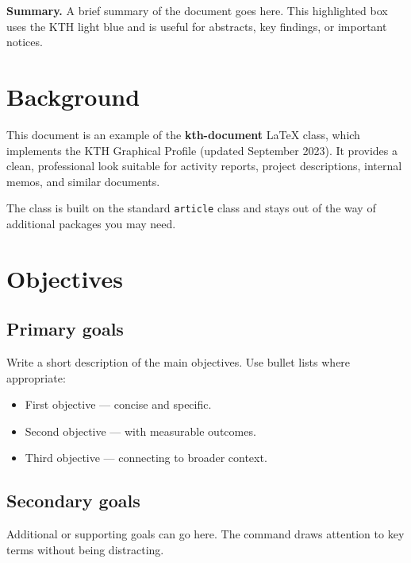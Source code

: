 \maketitle

\begin{kthbox}
  \textbf{Summary.}
  A brief summary of the document goes here. This highlighted box uses the
  KTH light blue and is useful for abstracts, key findings, or important notices. 
\end{kthbox}


\section{Background}

This document is an example of the \textbf{kth-document} LaTeX class, which
implements the KTH Graphical Profile (updated September 2023). It provides a
clean, professional look suitable for activity reports, project descriptions,
internal memos, and similar documents.

The class is built on the standard \texttt{article} class and stays out of the
way of additional packages you may need.


\section{Objectives}

\subsection{Primary goals}

Write a short description of the main objectives. Use bullet lists where
appropriate:

\begin{itemize}
  \item First objective — concise and specific.
  \item Second objective — with measurable outcomes.
  \item Third objective — connecting to broader context.
\end{itemize}

\subsection{Secondary goals}

Additional or supporting goals can go here. The 
command draws attention to key terms without being distracting.


